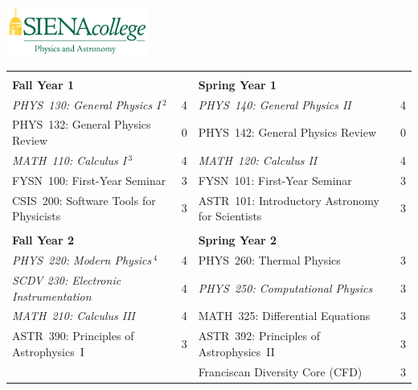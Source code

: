 \documentclass[12pt]{article}
\begin{document}
\hfill \includegraphics[width=0.35\textwidth]{siena_phys_astro_print_crop.jpg}

\vspace{0.1cm}
\vspace{0.3cm}

\vspace*{-5mm}
\begin{table}[h!]
\begin{center}
{\renewcommand{\arraystretch}{1.2}
\begin{tabular*}{0.9\textwidth}{@{\extracolsep{\fill}}lclc}
 & \\
{\Large \textbf{Fall Year 1}} & & {\Large \textbf{Spring Year 1}} & \\
\hline
{\em PHYS~130: General Physics I}\,$^{2}$  & 4 & {\em PHYS~140: General Physics II}     & 4 \\
PHYS~132: General Physics Review           & 0 & PHYS~142: General Physics Review & 0\\
{\em MATH~110: Calculus I}\,$^{3}$         & 4 & {\em MATH~120: Calculus II}            & 4 \\
FYSN~100: First-Year Seminar               & 3 & FYSN~101: First-Year Seminar     & 3\\
CSIS~200: Software Tools for Physicists    & 3 & ASTR~101: Introductory Astronomy for Scientists & 3 \\

 & \\
{\Large \textbf{Fall Year 2}} & & {\Large \textbf{Spring Year 2}} & \\
\hline
{\em PHYS~220: Modern Physics}\,$^{4}$     & 4 & PHYS~260: Thermal Physics        & 3 \\
{\em SCDV 230: Electronic Instrumentation} & 4 & {\em PHYS~250: Computational Physics} & 3  \\
{\em MATH~210: Calculus III}               & 4 & MATH~325: Differential Equations & 3 \\
ASTR~390: Principles of Astrophysics~I     & 3 & ASTR~392: Principles of Astrophysics~II  & 3 \\
                                           &   & Franciscan Diversity Core (CFD)  & 3 \\


\end{tabular*}}
\end{center}
\end{table}
\end{document}
